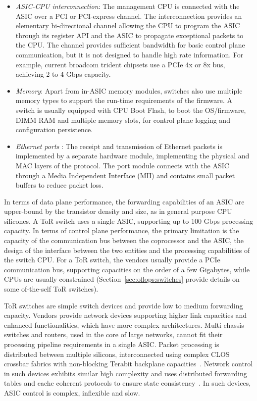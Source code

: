 \begin{itemize}
  \item \emph{ASIC-CPU interconnection}: The management CPU is connected with the ASIC
    over a PCI or PCI-express channel. The interconnection provides an
    elementary bi-directional channel allowing the CPU to program the ASIC
    through its register API and the ASIC to propagate exceptional packets to
    the CPU\@. The channel provides sufficient bandwidth for basic control plane
    communication, but it is not designed to handle high rate information. For
    example, current broadcom trident chipsets use a PCIe 4x or 8x bus,
    achieving 2 to 4 Gbps capacity.  

  \item \emph{Memory}: Apart from in-ASIC memory modules, switches
    also use multiple memory types to support the run-time requirements of the
    firmware. A switch is usually equipped with CPU Boot Flash, to boot the
    OS/firmware, DIMM RAM and multiple memory slots, for control plane logging
    and configuration persistence.

  \item \emph{Ethernet ports} : The receipt and transmission of Ethernet packets
    is implemented by a separate hardware module, 
    implementing the physical and MAC layers of the protocol. The port module 
    connects with the  ASIC through a Media Independent Interface (MII) and
    contains small packet buffers to reduce packet loss.  
\end{itemize}

In terms of data plane performance,  the forwarding capabilities of an ASIC are
upper-bound by the transistor density and size, as in general purpose CPU
silicones. A ToR switch uses a single ASIC, supporting up to 100 Gbps processing
capacity.  In terms of control plane performance, the primary limitation is the
capacity of the communication bus between the coprocessor and the ASIC, the
design of the interface between the two entities and the processing capabilities
of the switch CPU\@.  For a ToR switch, the vendors usually provide a PCIe
communication bus, supporting capacities on the order of a few Gigabytes, while
CPUs are usually constrained (Section~\ref{sec:oflops:switches} provide details
on some of-the-self ToR switches).

ToR switches are simple switch devices and provide low to medium forwarding
capacity. Vendors provide network devices supporting higher link capacities and
enhanced functionalities, which have more complex architectures. Multi-chassis
switches and routers, used in the core of large networks, cannot fit their
processing pipeline requirements in a single ASIC\@.  Packet processing is
distributed between multiple silicons, interconnected using complex CLOS
crossbar fabrics with non-blocking Terabit backplane
capacities~. Network control in such devices exhibits
similar high complexity and uses distributed forwarding tables and cache
coherent protocols to ensure state consistency~. In such
devices, ASIC control is complex, inflexible and slow.  

